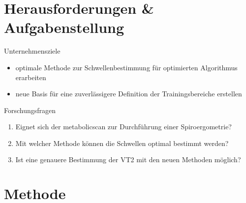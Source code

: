 \documentclass[colorBG,slideColor,8pt]{beamer}
\newcommand{\vcotwo}{\.{V}CO\textsubscript{2}}
\newcommand{\ve}{\.{V}E}
\begin{document}
\begin{frame}
\begin{columns}
\begin{column}{\linewidth}
\begin{figure}[H]
\begin{subfigure}[c]{0.2\linewidth}
		\subcaption{\ve/\vcotwo}
	\end{subfigure}
\end{figure}
\end{column}
\end{columns}
\end{frame}


\section{Herausforderungen \& Aufgabenstellung}

\begin{frame}
\begin{block}{Unternehmensziele}
	\begin{itemize}
		\item optimale Methode zur Schwellenbestimmung für optimierten Algorithmus erarbeiten
		\item neue Basis für eine zuverlässigere Definition der Trainingsbereiche erstellen
	\end{itemize}
\end{block}
\begin{block}{Forschungsfragen}
	\begin{enumerate}
		\item Eignet sich der metabolicscan zur Durchführung einer Spiroergometrie?
		\item Mit welcher Methode können die Schwellen optimal bestimmt werden?
		\item Ist eine genauere Bestimmung der VT2 mit den neuen Methoden möglich?
	\end{enumerate}
\end{block}
\end{frame}

\section{Methode}
\end{document}
